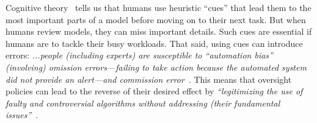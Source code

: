 Cognitive theory~\cite{simon1956rational} tells us that
  humans  use heuristic ``cues'' that lead them to the most important parts 
of a model before moving on to their next
task. But when humans review models, they can miss important details. Such cues are essential if humans are to tackle
their busy workloads. That said,  using cues can introduce errors:
   {\em 
   ...people (including experts) are susceptible to ``automation bias'' (involving)  omission errors—failing to take action because the automated system did not provide an alert—and commission error}~\cite{green2022flaws}.
 This means  that   oversight policies   can lead to the reverse of their desired effect  by {\em ``legitimizing the use of   faulty and controversial algorithms without addressing (their fundamental issues''}~\cite{green2022flaws}. 








